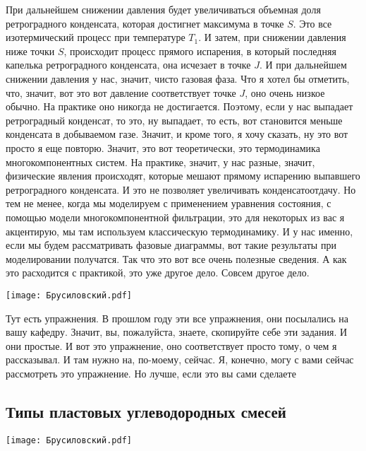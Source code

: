 \documentclass[main.tex]{subfiles}
\begin{document}
При дальнейшем снижении давления будет увеличиваться объемная доля ретроградного конденсата, которая достигнет максимума в точке $S$.
Это все изотермический процесс при температуре $T_1$.
И затем, при снижении давления ниже точки $S$, происходит процесс прямого испарения, в который последняя капелька ретроградного конденсата, она исчезает в точке $J$.
И при дальнейшем снижении давления у нас, значит, чисто газовая фаза.
Что я хотел бы отметить, что, значит, вот это вот давление соответствует точке $J$, оно очень низкое обычно.
На практике оно никогда не достигается.
Поэтому, если у нас выпадает ретроградный конденсат, то это, ну выпадает, то есть, вот становится меньше конденсата в добываемом газе.
Значит, и кроме того, я хочу сказать, ну это вот просто я еще повторю.
Значит, это вот теоретически, это термодинамика многокомпонентных систем.
На практике, значит, у нас разные, значит, физические явления происходят, которые мешают прямому испарению выпавшего ретроградного конденсата.
И это не позволяет увеличивать конденсатоотдачу.
Но тем не менее, когда мы моделируем с применением уравнения состояния, с помощью модели многокомпонентной фильтрации, это для некоторых из вас я акцентирую, мы там используем классическую термодинамику.
И у нас именно, если мы будем рассматривать фазовые диаграммы, вот такие результаты при моделировании получатся.
Так что это вот все очень полезные сведения.
А как это расходится с практикой, это уже другое дело.
Совсем другое дело.

\begin{center}
\texttt{[image: Брусиловский.pdf]}
\end{center}

Тут есть упражнения.
В прошлом году эти все упражнения, они посылались на вашу
кафедру.
Значит, вы, пожалуйста, знаете, скопируйте себе эти задания.
И они простые.
И вот это упражнение, оно соответствует просто тому, о чем я рассказывал.
И там нужно на, по-моему, сейчас.
Я, конечно, могу с вами сейчас рассмотреть это упражнение.
Но лучше, если это вы сами сделаете

\subsection{Типы пластовых углеводородных смесей}

\begin{center}
\texttt{[image: Брусиловский.pdf]}
\end{center}
\end{document}
